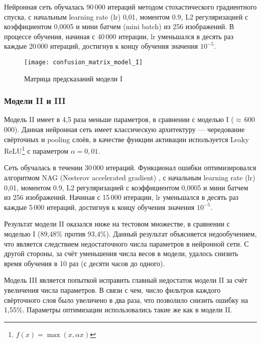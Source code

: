 Нейронная сеть обучалась 90\,000 итераций методом стохастического градиентного спуска,
с начальным learning rate (lr) 0,01, моментом 0.9, L2 регуляризацией с коэффициентом 0,0005 и 
мини батчем (mini batch) из 256 изображений. В процессе обучения, начиная с 40\,000 итерации, 
lr уменьшался в десять раз каждые 20\,000 итераций, достигнув к концу обучения значения $10^{-5}$.

\begin{figure}[H]
    \centering
    \texttt{[image: confusion\_matrix\_model\_I]}
    \vspace*{-1cm}
    \caption{Матрица предсказаний модели I}
    \label{fig:confusion_matrix_model_I}
\end{figure}

\subsubsection{Модели II и III}
Модель II имеет в 4,5 раза меньше параметров, в сравнении с моделью I ($\approx$\,600\,000).
Данная нейронная сеть имеет классическую архитектуру --- чередование свёрточных и pooling слоёв, в качестве
функции активации используется Leaky ReLU\footnote{$f(x) = \max(x, \alpha x)$} с параметром $\alpha = 0,01$.

Сеть обучалась в течении 30\,000 итераций. Функционал ошибки оптимизировался алгоритмом NAG (Nesterov accelerated gradient)
\cite{SutskeverMartensDahlHinton_icml2013}, с начальным learning rate (lr) 0,01, моментом 0.9, L2 регуляризацией с коэффициентом 0,0005 и 
мини батчем из 256 изображений. Начиная с 15\,000 итерации, 
lr уменьшался в десять раз каждые 5\,000 итераций, достигнув к концу обучения значения $10^{-5}$.

Результат модели II оказался ниже на тестовом множестве, в сравнении с моделью I (89,48\% против 93,4\%).
Данный результат объясняется недообучением, что является следствием недостаточного числа параметров в нейронной сети.
С другой стороны, за счёт уменьшения числа весов в модели, удалось снизить время обучения в 10 раз (с десяти часов до одного).

Модель III является попыткой исправить главный недостаток модели II за счёт увеличения числа параметров.
В связи с чем, число фильтров каждого свёрточного слоя было увеличено в два раза, что позволило снизить ошибку на 1,55\%.
Параметры оптимизации использовались такие же как в модели II.

